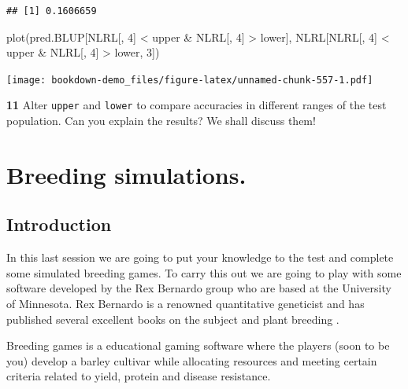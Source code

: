 \documentclass[
]{book}
\makeatletter
\newenvironment{Shaded}{\begin{snugshade}}{\end{snugshade}}
\newcommand{\DecValTok}[1]{\textcolor[rgb]{0.00,0.00,0.81}{#1}}
\newcommand{\FunctionTok}[1]{\textcolor[rgb]{0.00,0.00,0.00}{#1}}
\newcommand{\NormalTok}[1]{#1}
\newcommand{\SpecialCharTok}[1]{\textcolor[rgb]{0.00,0.00,0.00}{#1}}
\newenvironment{kframe}{%
\medskip{}
\setlength{\fboxsep}{.8em}
 \def\at@end@of@kframe{}%
 \ifinner\ifhmode%
  \def\at@end@of@kframe{\end{minipage}}%
  \begin{minipage}{\columnwidth}%
 \fi\fi%
 \def\FrameCommand##1{\hskip\@totalleftmargin \hskip-\fboxsep
 \colorbox{shadecolor}{##1}\hskip-\fboxsep
     \hskip-\linewidth \hskip-\@totalleftmargin \hskip\columnwidth}%
 \MakeFramed {\advance\hsize-\width
   \@totalleftmargin\z@ \linewidth\hsize
   \@setminipage}}%
 {\par\unskip\endMakeFramed%
 \at@end@of@kframe}
\newenvironment{rmdblock}[1]
  {
  \begin{itemize}
  \renewcommand{\labelitemi}{
    \raisebox{-.7\height}[0pt][0pt]{
      {\setkeys{Gin}{width=3em,keepaspectratio}\texttt{[image: images/\#1]}}
    }
  }
  \setlength{\fboxsep}{1em}
  \begin{kframe}
  \item
  }
  {
  \end{kframe}
  \end{itemize}
  }
\newenvironment{rmdquiz}
  {\begin{rmdblock}{quiz}}
  {\end{rmdblock}}
\makeatother
\begin{document}
\begin{verbatim}
## [1] 0.1606659
\end{verbatim}

\begin{Shaded}
\begin{Highlighting}[]
\FunctionTok{plot}\NormalTok{(pred.BLUP[NLRL[, }\DecValTok{4}\NormalTok{] }\SpecialCharTok{\textless{}}\NormalTok{ upper }\SpecialCharTok{\&}\NormalTok{ NLRL[, }\DecValTok{4}\NormalTok{] }\SpecialCharTok{\textgreater{}}\NormalTok{ lower], NLRL[NLRL[, }
    \DecValTok{4}\NormalTok{] }\SpecialCharTok{\textless{}}\NormalTok{ upper }\SpecialCharTok{\&}\NormalTok{ NLRL[, }\DecValTok{4}\NormalTok{] }\SpecialCharTok{\textgreater{}}\NormalTok{ lower, }\DecValTok{3}\NormalTok{])}
\end{Highlighting}
\end{Shaded}

\texttt{[image: bookdown-demo\_files/figure-latex/unnamed-chunk-557-1.pdf]}

\begin{rmdquiz}
\textbf{11}
Alter \texttt{upper} and \texttt{lower} to compare accuracies in different ranges of the test population.
Can you explain the results? We shall discuss them!
\end{rmdquiz}

\hypertarget{Breeding-simulations}{%
\chapter{Breeding simulations.}\label{Breeding-simulations}}

\hypertarget{introduction-6}{%
\section{Introduction}\label{introduction-6}}

In this last session we are going to put your knowledge to the test and complete some simulated breeding games. To carry this out we are going to play with some software developed by the Rex Bernardo group who are based at the University of Minnesota. Rex Bernardo is a renowned quantitative geneticist and has published several excellent books on the subject \citep{bernardo_breeding_2019} and plant breeding \citep{bernardo_essentials_2014}.

Breeding games is a educational gaming software where the players (soon to be you) develop a barley cultivar while allocating resources and meeting certain criteria related to yield, protein and disease resistance.
\end{document}
